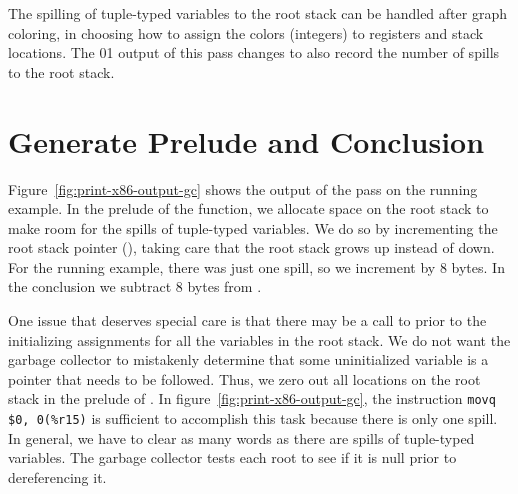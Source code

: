 \documentclass[7x10]{TimesAPriori_MIT}%
\def\racketEd{0}
\def\pythonEd{1}
\def\edition{1}
\newcommand{\racket}[1]{{\if\edition\racketEd{#1}\fi}}
\newcommand{\pythonColor}[0]{}
\newcommand{\python}[1]{{\if\edition\pythonEd\pythonColor #1\fi}}
\numberwithin{theorem}{chapter}
\numberwithin{definition}{chapter}
\numberwithin{equation}{chapter}
\begin{document}
The spilling of tuple-typed variables to the root stack can be handled
after graph coloring, in choosing how to assign the colors
(integers) to registers and stack locations. The
\racket{}\python{} output of this pass
changes to also record the number of spills to the root stack.

%




\section{Generate Prelude and Conclusion}
\label{sec:print-x86-gc}
\label{sec:prelude-conclusion-x86-gc}

Figure~\ref{fig:print-x86-output-gc} shows the output of the
 pass on the running example. In the
prelude of the  function, we allocate space
on the root stack to make room for the spills of tuple-typed
variables. We do so by incrementing the root stack pointer (),
taking care that the root stack grows up instead of down.  For the
running example, there was just one spill, so we increment 
by 8 bytes. In the conclusion we subtract 8 bytes from .

One issue that deserves special care is that there may be a call to
 prior to the initializing assignments for all the
variables in the root stack. We do not want the garbage collector to
mistakenly determine that some uninitialized variable is a pointer that
needs to be followed. Thus, we zero out all locations on the root
stack in the prelude of . In
figure~\ref{fig:print-x86-output-gc}, the instruction
%
\lstinline{movq $0, 0(%r15)}
%
is sufficient to accomplish this task because there is only one spill.
In general, we have to clear as many words as there are spills of
tuple-typed variables. The garbage collector tests each root to see
if it is null prior to dereferencing it. 
\end{document}
